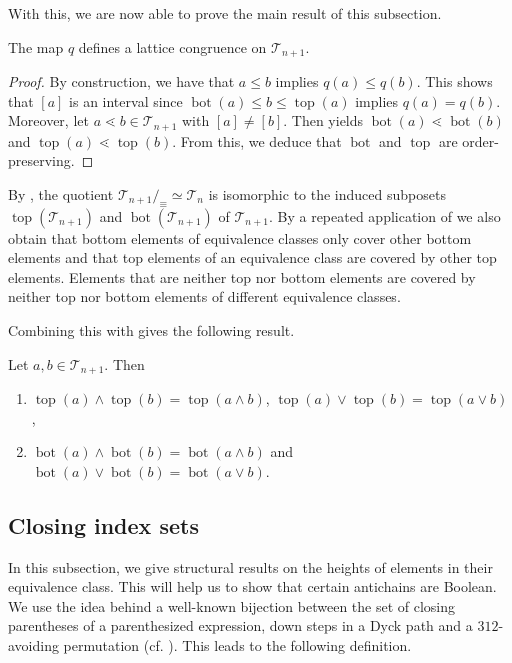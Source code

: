 \documentclass{preprint}
\newcommand{\topmap}{\operatorname{top}}
\newcommand{\botmap}{\operatorname{bot}}
\newcommand{\cT}{\mathcal{T}}
\theoremstyle{definition}
\begin{document}
With this, we are now able to prove the main result of this subsection.

\begin{proposition}\label{prop: LatticeCongruence}
    The map $q$ defines a lattice congruence on $\cT_{n+1}$.
\end{proposition}
\begin{proof}
  By construction, we have that $a\leq b$ implies $q(a)\leq q(b)$. This shows that $[a]$ is an interval since $\botmap(a)\leq b \leq \topmap(a)$ implies $q(a)=q(b)$. Moreover, let $a \lessdot b \in \cT_{n+1}$ with $[a]\neq [b]$. Then  yields $\botmap(a)\lessdot \botmap(b)$ and $\topmap(a)\lessdot\topmap(b)$. From this, we deduce that $\botmap$ and $\topmap$ are order-preserving.
\end{proof}

\begin{remark}\label{rem: banana lemma}
By \cite[Section 2]{Reading}, the quotient $\cT_{n+1} /_\equiv \simeq \cT_n$ is isomorphic to the induced subposets $\topmap(\cT_{n+1})$ and $\botmap(\cT_{n+1})$ of $\cT_{n+1}$. By a repeated application of  we also obtain that bottom elements of equivalence classes only cover other bottom elements and that top elements of an equivalence class are covered by other top elements. Elements that are neither top nor bottom elements are covered by neither top nor bottom elements of different equivalence classes. 
\end{remark}

Combining this with  gives the following result.

\begin{corollary}\label{cor: bot and top meet and join}
    Let $a,b \in \cT_{n+1}$. Then
    \begin{enumerate}
        \item $\topmap(a)\wedge \topmap(b) = \topmap(a\wedge b)$, $\topmap(a)\vee \topmap(b) = \topmap(a\vee b)$,
        \item $\botmap(a)\wedge \botmap(b) = \botmap(a\wedge b)$ and $\botmap(a)\vee \botmap(b) = \botmap(a\vee b)$.
    \end{enumerate}
\end{corollary}

\subsection{Closing index sets}\label{sec: closing index sets}
In this subsection, we give structural results on the heights of elements in their equivalence class. This will help us to show that certain antichains are Boolean.
We use the idea behind a well-known bijection between the set of closing parentheses of a parenthesized expression, down steps in a Dyck path and a $312$-avoiding permutation (cf. \cite[Section 2.2.1]{Knuth}). This leads to the following definition.
\end{document}
